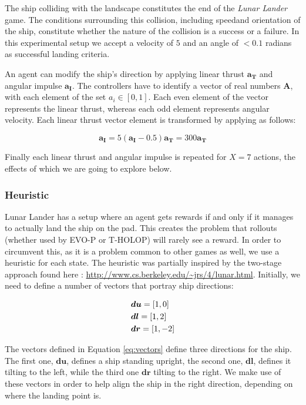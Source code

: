 \documentclass[conference]{IEEEtran}
\begin{document}
The ship colliding with the landscape constitutes the end of the {\itshape Lunar Lander} game. The conditions surrounding this collision, including speedand orientation of the ship, constitute whether the nature of the collision is a success or a failure. In this experimental setup we accept a velocity of $5$ and an angle of $< 0.1$ radians as successful landing criteria.

An agent can modify the ship's direction by applying linear thrust $\bm{a_T}$ and angular impulse $\bm{a_I}$. The controllers have to identify a vector of real numbers $\bm{A}$, with each element of the set $a_i \in [0,1]$. Each even element of the vector represents the linear thrust, whereas each odd element represents angular velocity. Each linear thrust vector element is transformed by applying as follows: 

\begin{equation}
\bm{a_I} = 5(\bm{a_I} - 0.5)
\bm{a_T} = 300\bm{a_T} 
\end{equation}

Finally each linear thrust and angular impulse is repeated for $X = 7$ actions, the effects of which we are going to explore below. 

\subsubsection{Heuristic} %

Lunar Lander has a setup where an agent gets rewards if and only if it manages to actually land the ship on the pad. This creates the problem that rollouts (whether used by EVO-P or T-HOLOP) will rarely see a reward. In order to circumvent this, as it is a problem common to other games as well, we use a heuristic for each state. The heuristic was partially inspired by the two-stage approach found here : \url{http://www.cs.berkeley.edu/~jrs/4/lunar.html}\cite{lunar}. Initially, we need to define a number of vectors that portray ship directions: 

\begin{align}
& \bm{du} = [1,0]\notag\\ 
& \bm{dl} = [1,2]\notag\\
& \bm{dr} = [1,-2]
\label{eq:vectors}
\end{align}


The vectors defined in Equation \ref{eq:vectors} define three directions for the ship. The first one, $\bm{du}$, defines a ship standing upright, the second one, $\bm{dl}$, defines it tilting to the left, while the third one $\bm{dr}$ tilting to the right. We make use of these vectors in order to help align the ship in the right direction, depending on where the landing point is. 
\end{document}
